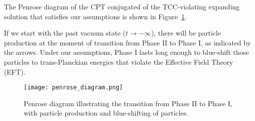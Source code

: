 \documentclass[12pt]{article}
\begin{document}
The Penrose diagram of the CPT conjugated of the TCC-violating expanding solution that satisfies our assumptions is shown in Figure~\ref{fig:penrose_diagram}. 

If we start with the past vacuum state ($t \rightarrow -\infty$), there will be particle production at the moment of transition from Phase II to Phase I, as indicated by the arrows. Under our assumptions, Phase I lasts long enough to blue-shift those particles to trans-Planckian energies that violate the Effective Field Theory (EFT). 

\begin{figure}[h]
    \centering
    \texttt{[image: penrose\_diagram.png]} %
    \caption{Penrose diagram illustrating the transition from Phase II to Phase I, with particle production and blue-shifting of particles.}
    \label{fig:penrose_diagram}
\end{figure}
\end{document}
